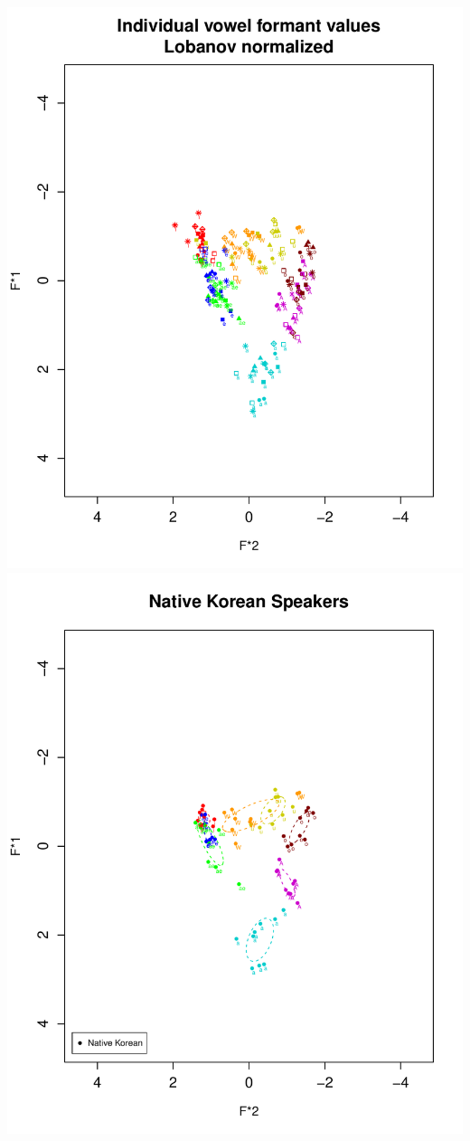 \documentclass[man, fleqn, noextraspace]{apa6}
\begin{document}
\includegraphics{Group_5_Final_paper_files/figure-latex/SECTION2-1.pdf}
\includegraphics{Group_5_Final_paper_files/figure-latex/SECTION2-2.pdf}
\end{document}
